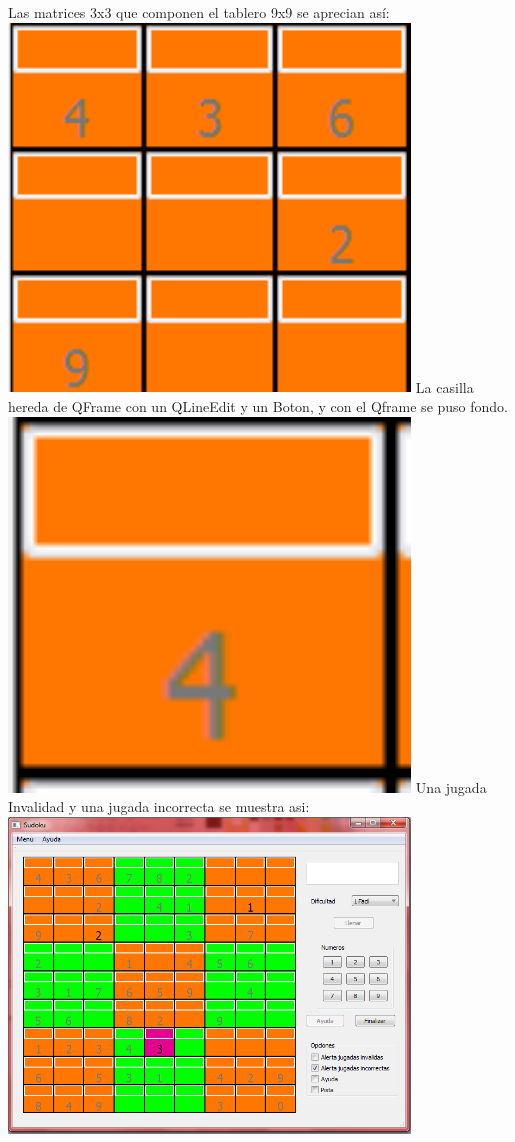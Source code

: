 \documentclass[12pt,oneside]{book}
\begin{document}
	Las matrices 3x3 que componen el tablero 9x9 se aprecian así:
	\includegraphics[width=0.8\textwidth]{./imagenes/cuadr9x9.png}
	La casilla hereda de QFrame con un QLineEdit y un Boton, y con el Qframe se puso fondo. 
	\includegraphics[width=0.8\textwidth]{./imagenes/Casilla.png}
	Una jugada Invalidad y una jugada incorrecta se muestra asi:
	\includegraphics[width=0.8\textwidth]{./imagenes/jugada_incorrecta.png}
\end{document}
